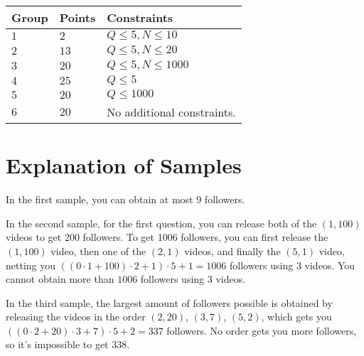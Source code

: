 \noindent
\begin{tabular}{| l | l | p{12cm} |}
  \hline
  \textbf{Group} & \textbf{Points} & \textbf{Constraints} \\ \hline
  $1$    & $2$        & $Q \leq 5, N \leq 10$ \\ \hline
  $2$    & $13$       & $Q \leq 5, N \leq 20$ \\ \hline
  $3$    & $20$       & $Q \leq 5, N \leq 1000$ \\ \hline
  $4$    & $25$       & $Q \leq 5$ \\ \hline
  $5$    & $20$       & $Q \leq 1000$ \\ \hline
  $6$    & $20$       & No additional constraints. \\ \hline
\end{tabular}

\section*{Explanation of Samples}
In the first sample, you can obtain at most 9 followers.

In the second sample, for the first question, you can release both of the $(1,100)$ videos to get 200 followers.
To get 1006 followers, you can first release the $(1,100)$ video, then one of the $(2,1)$ videos, and finally the $(5,1)$ video,
netting you $((0 \cdot 1 + 100) \cdot 2 + 1) \cdot 5 + 1= 1006$ followers using 3 videos. You cannot obtain more than $1006$
followers using 3 videos.

In the third sample, the largest amount of followers possible is obtained by releasing the videos in the order
$(2,20)$, $(3,7)$, $(5,2)$, which gets you $((0 \cdot 2 + 20) \cdot 3 + 7) \cdot 5 + 2=337$ followers.
No order gets you more followers, so it's impossible to get $338$.
